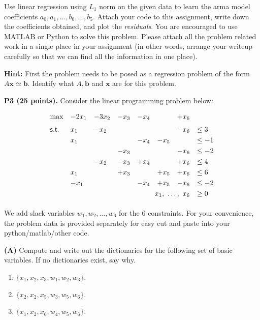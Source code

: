 \documentclass[11pt]{article}
\begin{document}
Use linear regression using $L_1$ norm on the given data to 
learn the arma model
coefficients $a_0, a_1, \ldots, b_0, \ldots, b_5$. Attach your code to this assignment, 
write down the coefficients obtained, and plot the \emph{residuals}. You are encouraged to use
MATLAB or Python to solve this problem. Please attach all the problem
related work in a single place in your assignment (in other words,
arrange your writeup carefully so that we can find all the information
in one place).

\noindent\textbf{Hint:} First the problem needs to be posed as a
regression problem of the form $A \mathbf{x} \simeq \mathbf{b}$.
Identify what $A, \mathbf{b}$ and $\mathbf{x}$ are for this problem.


\bigskip

\noindent\textbf{P3 (25 points).} Consider the linear programming problem below:

\[ \begin{array}{llllllllll}
\max & -2 x_1 & - 3 x_2 & - x_3 & - x_4 &  & + x_6 \\[6pt]
\mathsf{s.t.} & x_1 & - x_2 &   &   &  & - x_6 & \leq 3\\[3pt]
&  x_1 &    &     &    -x_4 &   -x_5  &  & \leq -1 \\[3pt]
&  &  & - x_3 & & & - x_6 & \leq -2 \\[3pt]
&  & -x_2 & -x_3 & + x_4 & & + x_6 & \leq 4\\[3pt]
& x_1 & & + x_3 & & + x_5 & + x_6 & \leq 6\\[3pt]
& -x_1 & &  & -x_4 & + x_5 & - x_6 & \leq -2 \\[3pt]
& \multicolumn{6}{r}{x_1,\ \ldots,\ x_6} & \geq 0\\[3pt]
\end{array}\]

We add slack variables $w_1, w_2, \ldots, w_6$ for the $6$
constraints. For your convenience, the problem data is provided
separately for easy cut and paste into your python/matlab/other code.

\noindent\textbf{(A)} Compute and write out the 
dictionaries for the following
set of basic variables. If no dictionaries exist, say why.

\begin{enumerate}
\item $\{ x_1, x_2, x_3, w_1, w_2, w_3 \}$.
\item $\{ x_2, x_2, x_5, w_3, w_5, w_6 \}$.
\item $\{x_1, x_2, x_6, w_{4}, w_5, w_6 \}$.
\end{enumerate}
\end{document}
